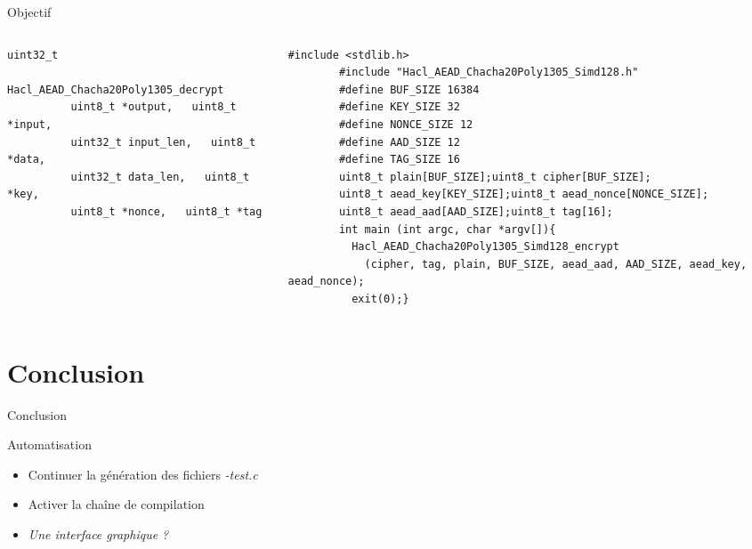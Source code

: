 \documentclass[A4,svgnames,9pt,aspectratio=169]{beamer}
\begin{document}
\begin{frame}[fragile]{Objectif}

  \begin{columns}
  
    \begin{column}{0.37\textwidth}
        \begin{lstlisting}[style=global, caption={Hacl\_AEAD\_Chacha20Poly1305\_decrypt}, gobble=8]
        uint32_t
        Hacl_AEAD_Chacha20Poly1305_decrypt
          uint8_t *output,   uint8_t *input,
          uint32_t input_len,   uint8_t *data,
          uint32_t data_len,   uint8_t *key,
          uint8_t *nonce,   uint8_t *tag
      \end{lstlisting}
      
    \end{column}

    \begin{column}{0.7\textwidth}
        \begin{lstlisting}[style=CStyle, caption={Hacl\_AEAD\_Chacha20Poly1305\_Simd128\_encrypt-test.c}, captionpos=t, gobble=8]
        #include <stdlib.h>
        #include "Hacl_AEAD_Chacha20Poly1305_Simd128.h"
        #define BUF_SIZE 16384
        #define KEY_SIZE 32
        #define NONCE_SIZE 12
        #define AAD_SIZE 12
        #define TAG_SIZE 16
        uint8_t plain[BUF_SIZE];uint8_t cipher[BUF_SIZE];
        uint8_t aead_key[KEY_SIZE];uint8_t aead_nonce[NONCE_SIZE];
        uint8_t aead_aad[AAD_SIZE];uint8_t tag[16];
        int main (int argc, char *argv[]){
          Hacl_AEAD_Chacha20Poly1305_Simd128_encrypt
            (cipher, tag, plain, BUF_SIZE, aead_aad, AAD_SIZE, aead_key, aead_nonce);
          exit(0);}
      \end{lstlisting}
    \end{column}

  \end{columns}

\end{frame}



\section{Conclusion}
\frame{\sectionpage}

\begin{frame}{Conclusion}
  \begin{block}{Automatisation}
    \begin{itemize}
      \item Continuer la génération des fichiers \textit{-test.c}
      \item Activer la chaîne de compilation
      \pause
      \item \textit{Une interface graphique ?}
    \end{itemize}
  \end{block}

\end{frame}


\frame{\merci}
\end{document}
